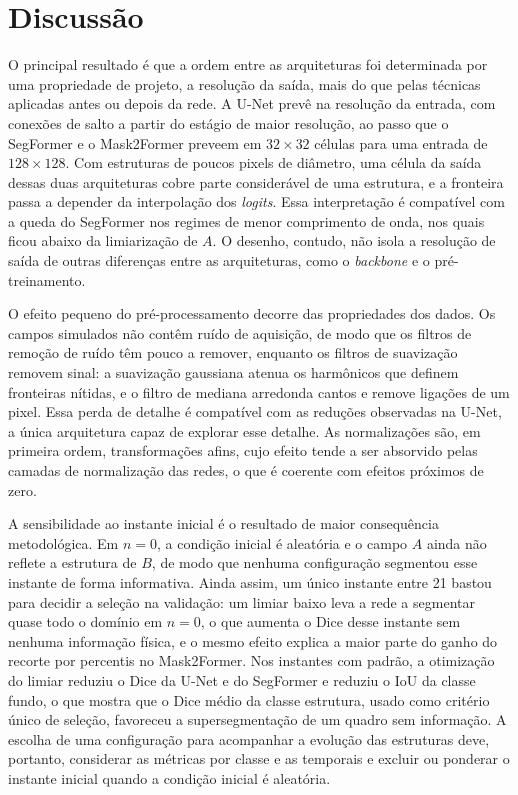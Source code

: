 \documentclass[12pt]{article}
\begin{document}
\section{Discussão}
\label{sec:discussao}

O principal resultado é que a ordem entre as arquiteturas foi determinada por uma propriedade de projeto, a resolução da saída, mais do que pelas técnicas aplicadas antes ou depois da rede. A U-Net prevê na resolução da entrada, com conexões de salto a partir do estágio de maior resolução, ao passo que o SegFormer e o Mask2Former preveem em $32\times32$ células para uma entrada de $128\times128$. Com estruturas de poucos pixels de diâmetro, uma célula da saída dessas duas arquiteturas cobre parte considerável de uma estrutura, e a fronteira passa a depender da interpolação dos \textit{logits}. Essa interpretação é compatível com a queda do SegFormer nos regimes de menor comprimento de onda, nos quais ficou abaixo da limiarização de $A$. O desenho, contudo, não isola a resolução de saída de outras diferenças entre as arquiteturas, como o \textit{backbone} e o pré-treinamento.

O efeito pequeno do pré-processamento decorre das propriedades dos dados. Os campos simulados não contêm ruído de aquisição, de modo que os filtros de remoção de ruído têm pouco a remover, enquanto os filtros de suavização removem sinal: a suavização gaussiana atenua os harmônicos que definem fronteiras nítidas, e o filtro de mediana arredonda cantos e remove ligações de um pixel. Essa perda de detalhe é compatível com as reduções observadas na U-Net, a única arquitetura capaz de explorar esse detalhe. As normalizações são, em primeira ordem, transformações afins, cujo efeito tende a ser absorvido pelas camadas de normalização das redes, o que é coerente com efeitos próximos de zero.

A sensibilidade ao instante inicial é o resultado de maior consequência metodológica. Em $n=0$, a condição inicial é aleatória e o campo $A$ ainda não reflete a estrutura de $B$, de modo que nenhuma configuração segmentou esse instante de forma informativa. Ainda assim, um único instante entre 21 bastou para decidir a seleção na validação: um limiar baixo leva a rede a segmentar quase todo o domínio em $n=0$, o que aumenta o Dice desse instante sem nenhuma informação física, e o mesmo efeito explica a maior parte do ganho do recorte por percentis no Mask2Former. Nos instantes com padrão, a otimização do limiar reduziu o Dice da U-Net e do SegFormer e reduziu o IoU da classe fundo, o que mostra que o Dice médio da classe estrutura, usado como critério único de seleção, favoreceu a supersegmentação de um quadro sem informação. A escolha de uma configuração para acompanhar a evolução das estruturas deve, portanto, considerar as métricas por classe e as temporais e excluir ou ponderar o instante inicial quando a condição inicial é aleatória.
\end{document}
